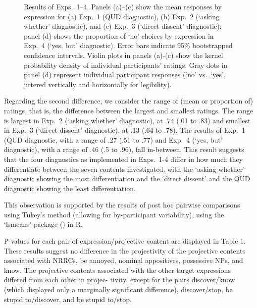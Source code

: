 \documentclass[times,linguex,xcolor]{glossa}
\begin{document}
\begin{figure}[h!]
    \caption{Results of Exps.~1--4. Panels (a)--(c) show the mean responses by expression for (a) Exp.~1 (QUD diagnostic),  (b) Exp.~2 (`asking whether' diagnostic), and (c) Exp.~3 (`direct dissent' diagnostic); panel (d) shows the proportion of `no' choices by expression in Exp.~4 (`yes, but' diagnostic). Error bars indicate 95\% bootstrapped confidence intervals. Violin plots in panels (a)-(c) show the kernel probability density of individual participants' ratings. Gray dots in panel (d) represent individual participant responses (`no' vs.\ `yes', jittered vertically and horizontally for legibility).}
    \label{fig:results}
  \end{figure}
  
Regarding the second difference, we consider the range of (mean or proportion of) ratings, that is, the difference between the largest and smallest ratings. The range is largest in Exp.~2 (`asking whether' diagnostic), at .74 (.01 to .83) and smallest in Exp.~3 (`direct dissent' diagnostic), at .13 (.64 to .78). The results of Exp.~1 (QUD diagnostic, with a range of .27 (.51 to .77) and Exp.~4 (`yes, but' diagnostic), with a range of .46 (.5 to .96), fall in-between. This result suggests that the four diagnostics as implemented in Exps.~1-4 differ in how much they differentiate between the seven contents investigated, with the `asking whether' diagnostic showing the most differentiation and the `direct dissent' and the QUD diagnostic showing the least differentiation.
  
 
 
  
 
This observation is supported by the results of post hoc pairwise comparisons using Tukey's method (allowing for by-participant variability), using the `lsmeans' package (\citealt{tukey}) in R.

P-values for each pair of expression/projective content are displayed in Table 1. These
results suggest no difference in the projectivity of the projective contents associated with
NRRCs, be annoyed, nominal appositives, possessive NPs, and know. The projective
contents associated with the other target expressions differed from each other in projec-
tivity, except for the pairs discover/know (which displayed only a marginally significant
difference), discover/stop, be stupid to/discover, and be stupid to/stop.
\end{document}
